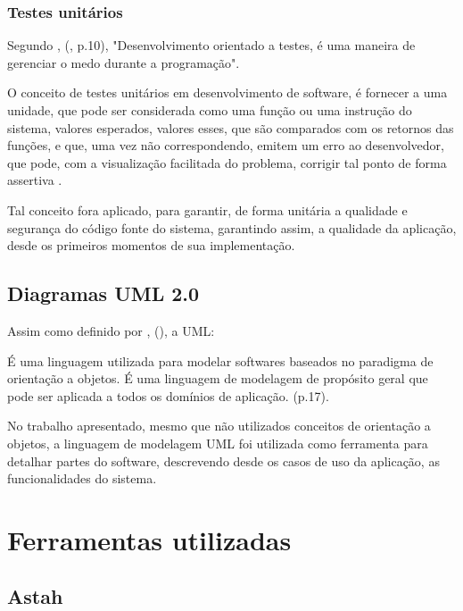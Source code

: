 \subsection{Testes unitários}

Segundo , (\citeyear{tdd_by_example}, p.10), "Desenvolvimento orientado a testes, é uma maneira de gerenciar o medo durante a programação".

O conceito de testes unitários em desenvolvimento de software, é fornecer a uma unidade, que pode ser considerada como uma função ou uma instrução do sistema, valores esperados, valores esses, que são comparados com os retornos das funções, e que, uma vez não correspondendo, emitem um erro ao desenvolvedor, que pode, com a visualização facilitada do problema, corrigir tal ponto de forma assertiva \cite{tdd_by_example}.

Tal conceito fora aplicado, para garantir, de forma unitária a qualidade e segurança do código fonte do sistema, garantindo assim, a qualidade da aplicação, desde os primeiros momentos de sua implementação.

\section{Diagramas UML 2.0}

Assim como definido por , (\citeyear{uml_pratica}), a UML:

\begin{citacao}
    É uma linguagem utilizada para modelar softwares baseados no paradigma de orientação a objetos. É uma linguagem de modelagem de propósito geral que pode ser aplicada a todos os domínios de aplicação. (p.17).
\end{citacao}

No trabalho apresentado, mesmo que não utilizados conceitos de orientação a objetos, a linguagem de modelagem UML foi utilizada como ferramenta para detalhar partes do software, descrevendo desde os casos de uso da aplicação, as funcionalidades do sistema.

\chapter{Ferramentas utilizadas}

\section{Astah}

